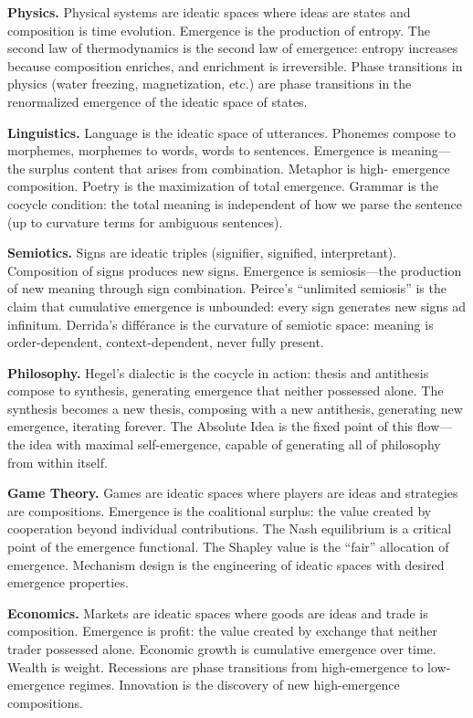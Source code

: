 \textbf{Physics.} Physical systems are ideatic spaces where ideas are states
and composition is time evolution. Emergence is the production of entropy. The
second law of thermodynamics is the second law of emergence: entropy increases
because composition enriches, and enrichment is irreversible. Phase transitions
in physics (water freezing, magnetization, etc.) are phase transitions in the
renormalized emergence of the ideatic space of states.

\textbf{Linguistics.} Language is the ideatic space of utterances. Phonemes
compose to morphemes, morphemes to words, words to sentences. Emergence is
meaning---the surplus content that arises from combination. Metaphor is high-
emergence composition. Poetry is the maximization of total emergence. Grammar
is the cocycle condition: the total meaning is independent of how we parse
the sentence (up to curvature terms for ambiguous sentences).

\textbf{Semiotics.} Signs are ideatic triples (signifier, signified, interpretant).
Composition of signs produces new signs. Emergence is semiosis---the production
of new meaning through sign combination. Peirce's ``unlimited semiosis'' is
the claim that cumulative emergence is unbounded: every sign generates new signs
ad infinitum. Derrida's différance is the curvature of semiotic space: meaning
is order-dependent, context-dependent, never fully present.

\textbf{Philosophy.} Hegel's dialectic is the cocycle in action: thesis and
antithesis compose to synthesis, generating emergence that neither possessed
alone. The synthesis becomes a new thesis, composing with a new antithesis,
generating new emergence, iterating forever. The Absolute Idea is the fixed
point of this flow---the idea with maximal self-emergence, capable of generating
all of philosophy from within itself.

\textbf{Game Theory.} Games are ideatic spaces where players are ideas and
strategies are compositions. Emergence is the coalitional surplus: the value
created by cooperation beyond individual contributions. The Nash equilibrium is
a critical point of the emergence functional. The Shapley value is the ``fair''
allocation of emergence. Mechanism design is the engineering of ideatic spaces
with desired emergence properties.

\textbf{Economics.} Markets are ideatic spaces where goods are ideas and trade
is composition. Emergence is profit: the value created by exchange that neither
trader possessed alone. Economic growth is cumulative emergence over time. Wealth
is weight. Recessions are phase transitions from high-emergence to low-emergence
regimes. Innovation is the discovery of new high-emergence compositions.

